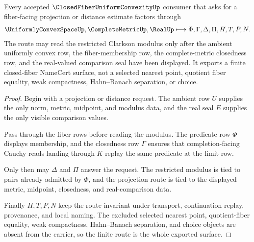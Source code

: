 \begin{theorem}
\label{thm:closed-fiber-uniform-convexity-projection-route}
Every accepted $\ClosedFiberUniformConvexityUp$ consumer that asks for a fiber-facing projection or distance estimate factors through
$$
\UniformlyConvexSpaceUp,\CompleteMetricUp,\RealUp \longmapsto \Phi,\Gamma,\Delta,\Pi,H,T,P,N .
$$
The route may read the restricted Clarkson modulus only after the ambient uniformly convex row, the fiber-membership row, the complete-metric closedness row, and the real-valued comparison seal have been displayed. It exports a finite closed-fiber NameCert surface, not a selected nearest point, quotient fiber equality, weak compactness, Hahn--Banach separation, or choice.
\end{theorem}
\begin{proof}
Begin with a projection or distance request. The ambient row $U$ supplies the only norm, metric, midpoint, and modulus data, and the real seal $E$ supplies the only visible comparison values.

Pass through the fiber rows before reading the modulus. The predicate row $\Phi$ displays membership, and the closedness row $\Gamma$ ensures that completion-facing Cauchy reads landing through $K$ replay the same predicate at the limit row.

Only then may $\Delta$ and $\Pi$ answer the request. The restricted modulus is tied to pairs already admitted by $\Phi$, and the projection route is tied to the displayed metric, midpoint, closedness, and real-comparison data.

Finally $H,T,P,N$ keep the route invariant under transport, continuation replay, provenance, and local naming. The excluded selected nearest point, quotient-fiber equality, weak compactness, Hahn--Banach separation, and choice objects are absent from the carrier, so the finite route is the whole exported surface.
\end{proof}



